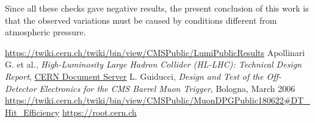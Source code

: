 \documentclass[12pt,twoside,a4paper]{report}
\numberwithin{equation}{section}
\begin{document}
Since all these checks gave negative results, the present conclusion of this work is that the observed variations must be caused by conditions different from atmospheric pressure.

\newpage
{}

\begin{thebibliography}{200}
 \url{https://twiki.cern.ch/twiki/bin/view/CMSPublic/LumiPublicResults}
 Apollinari G. et al., \textit{High-Luminosity Large Hadron Collider (HL-LHC): Technical Design Report}, \href{<http://cds.cern.ch/record/2284929/files/40-39-PB.pdf?version=1>}{CERN Document Server}
 L. Guiducci, \textit{Design and Test of the Off-Detector Electronics for the CMS Barrel Muon Trigger}, Bologna, March 2006
 \url{https://twiki.cern.ch/twiki/bin/view/CMSPublic/MuonDPGPublic180622#DT_Hit_Efficiency}
 \url{https://root.cern.ch}

\end{thebibliography}
\end{document}

